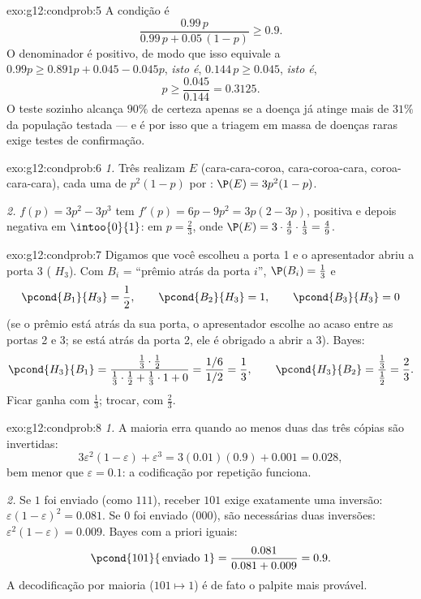 \begin{solution}{exo:g12:condprob:5}
A condição é
\[
\frac{0.99\,p}{0.99\,p + 0.05\,(1-p)} \geq 0.9 .
\]
O denominador é positivo, de modo que isso equivale a
$0.99p \geq 0.891p + 0.045 - 0.045p$, \emph{isto é},
$0.144\,p \geq 0.045$, \emph{isto é},
\[
p \geq \frac{0.045}{0.144} = 0.3125 .
\]
O teste sozinho alcança $90\%$ de certeza apenas se a doença já atinge
mais de $31\%$ da população testada --- e é por isso que a triagem em
massa de doenças raras exige testes de confirmação.
\end{solution}

\begin{solution}{exo:g12:condprob:6}
\emph{1.} Três  realizam $E$ (cara-cara-coroa, cara-coroa-cara,
coroa-cara-cara), cada uma de  $p^2(1-p)$ por :
$\P(E) = 3p^2(1 - p)$.

\emph{2.} $f(p) = 3p^2 - 3p^3$ tem $f'(p) = 6p - 9p^2 = 3p(2 - 3p)$,
positiva e depois negativa em $\intoo{0}{1}$:  em $p = \frac23$,
onde $\P(E) = 3\cdot\frac49\cdot\frac13 = \frac49$.
\end{solution}

\begin{solution}{exo:g12:condprob:7}
Digamos que você escolheu a porta 1 e o apresentador abriu a porta 3
( $H_3$). Com $B_i$ = ``prêmio atrás da porta $i$'',
$\P(B_i) = \frac13$ e
\[
\pcond{B_1}{H_3} = \frac12, \qquad
\pcond{B_2}{H_3} = 1, \qquad
\pcond{B_3}{H_3} = 0
\]
(se o prêmio está atrás da sua porta, o apresentador escolhe ao acaso
entre as portas 2 e 3; se está atrás da porta 2, ele é obrigado a abrir a
3). Bayes:
\[
\pcond{H_3}{B_1}
= \frac{\frac13\cdot\frac12}{\frac13\cdot\frac12 + \frac13\cdot1 + 0}
= \frac{1/6}{1/2} = \frac13,
\qquad
\pcond{H_3}{B_2} = \frac{\frac13}{\frac12} = \frac23 .
\]
Ficar ganha com  $\frac13$; trocar, com 
$\frac23$.
\end{solution}

\begin{solution}{exo:g12:condprob:8}
\emph{1.} A maioria erra quando ao menos duas das três cópias são
invertidas:
\[
3\varepsilon^2(1-\varepsilon) + \varepsilon^3
= 3(0.01)(0.9) + 0.001 = 0.028,
\]
bem menor que $\varepsilon = 0.1$: a codificação por repetição funciona.

\emph{2.} Se $1$ foi enviado (como $111$), receber $101$ exige exatamente
uma inversão:  $\varepsilon(1-\varepsilon)^2 = 0.081$. Se $0$
foi enviado ($000$), são necessárias duas inversões:
$\varepsilon^2(1-\varepsilon) = 0.009$. Bayes com  a priori
iguais:
\[
\pcond{101}{\,\text{enviado }1} = \frac{0.081}{0.081 + 0.009} = 0.9 .
\]
A decodificação por maioria ($101 \mapsto 1$) é de fato o palpite mais
provável.
\end{solution}

